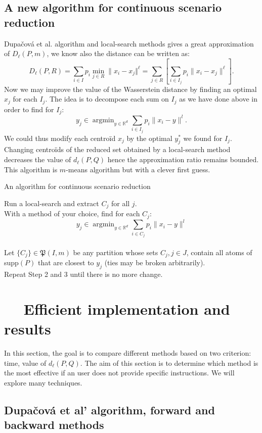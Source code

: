 \documentclass{amsart}
\newcommand{\argmin}{\mathop{\arg\min}}
\newcommand{\RR}{\mathbb{R}}
\begin{document}
\subsection{A new algorithm for continuous scenario reduction}
Dupačová et al. algorithm and local-search methods gives a great approximation of $D_\ell\left(P,m\right)$, we know also the distance can be written as:
$$D_\ell\left(P,R\right)=\sum_{i\in I}p_i\min_{j\in R}\lVert x_i-x_j\Vert^\ell=\sum_{j\in R}\left[\sum_{i\in I_j}p_i\lVert x_i-x_j\rVert^\ell\right].$$
Now we may improve the value of the Wasserstein distance by finding an optimal $x_j$ for each $I_j$. The idea is to decompose each sum on $I_j$ as we have done above in order to find for $I_j$: 
$$
y_j\in \argmin_{y\in\RR^d}\sum_{i\in I_j}p_i\lVert x_i-y\rVert^l.
$$
We could thus modify each centroïd $x_j$ by the optimal $y^*_j$ we found for $I_j$. Changing centroïds of the reduced set obtained by a local-search method decreases the value of $d_\ell\left(P,Q\right)$ hence the approximation ratio remains bounded. This algorithm is $m$-means algorithm but with a clever first guess. \clearpage

\begin{algorithm}[h]\caption{An algorithm for continuous scenario reduction}
    \label{improved ls}
    Run a local-search and extract $C_j$ for all $j$. \\
    With a method of your choice, find for each $C_j$: $$y_j\in\argmin_{y\in\RR^d}\sum_{i\in C_j}p_i\lVert x_i-y\rVert^l$$
    \\ Let $\{C_j\}\in\mathfrak{P}\left(I,m\right)$ be any partition whose sets $C_j, j\in J$, contain all atoms of supp$\left(P\right)$ that are closest to $y_j$ (ties may be broken arbitrarily). \\
    Repeat Step 2 and 3 until there is no more change.
\end{algorithm}

\section{$\quad$ Efficient implementation and results}\label{fast}
In this section, the goal is to compare different methods based on two criterion: time, value of $d_\ell\left(P,Q\right)$. The aim of this section is to determine which method is the most effective if an user does not provide specific instructions. We will explore many techniques. 
\subsection{Dupačová et al' algorithm, forward and backward methods}
\end{document}
